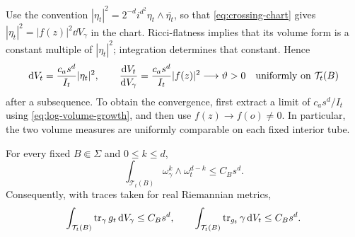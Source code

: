 Use the convention
$|\eta_t|^2=2^{-d}i^{d^2}\eta_t\wedge\overline{\eta_t}$, so that
\eqref{eq:crossing-chart} gives
$|\eta_t|^2=|f(z)|^2\dd V_\gamma$ in the chart.  Ricci-flatness implies
that its volume form is a constant multiple of $|\eta_t|^2$; integration
determines that constant.  Hence
\begin{equation}
 \mathrm d V_t=\frac{c_a s^d}{I_t}|\eta_t|^2,
 \qquad
 \frac{\mathrm d V_t}{\mathrm d V_\gamma}
       =\frac{c_a s^d}{I_t}|f(z)|^2
       \longrightarrow\vartheta>0
 \quad\hbox{uniformly on }\mathcal T_t(B)
 \label{eq:coordinate-density}
\end{equation}
after a subsequence.  To obtain the convergence, first extract a limit
of $c_a s^d/I_t$ using \eqref{eq:log-volume-growth}, and then use
$f(z)\to f(o)\ne0$.  In particular, the two volume measures are uniformly
comparable on each fixed interior tube.

\begin{lemma}
\label{lem:mixed-estimates}
For every fixed $B\Subset\Sigma$ and $0\le k\le d$,
\begin{equation}
 \int_{\mathcal T_t(B)}\omega_\gamma^k\wedge\omega_t^{d-k}
       \le C_B s^d.
 \label{eq:mixed-estimates}
\end{equation}
Consequently, with traces taken for real Riemannian metrics,
\begin{equation}
 \int_{\mathcal T_t(B)}\operatorname{tr}_\gamma g_t\,\mathrm d V_\gamma\le C_Bs^d,
 \qquad
 \int_{\mathcal T_t(B)}\operatorname{tr}_{g_t}\gamma\,\mathrm d V_t\le C_Bs^d.
 \label{eq:trace-estimates}
\end{equation}
\end{lemma}

